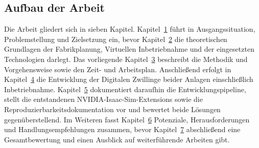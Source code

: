\subsection{Aufbau der Arbeit}
Die Arbeit gliedert sich in sieben Kapitel.
Kapitel~\hyperref[sec:einleitung]{1} führt in Ausgangssituation, Problemstellung und
Zielsetzung ein, bevor Kapitel~\hyperref[sec:grundlagen]{2} die theoretischen
Grundlagen der Fabrikplanung, Virtuellen Inbetriebnahme und der eingesetzten
Technologien darlegt.
Das vorliegende Kapitel~\hyperref[sec:methodik]{3} beschreibt die Methodik und
Vorgehensweise sowie den Zeit- und Arbeitsplan.
Anschließend erfolgt in Kapitel~\hyperref[sec:entwicklung]{4} die Entwicklung der
Digitalen Zwillinge beider Anlagen einschließlich Inbetriebnahme.
Kapitel~\hyperref[sec:ergebnisse]{5} dokumentiert daraufhin die Entwicklungspipeline,
stellt die entstandenen NVIDIA-Isaac-Sim-Extensions sowie die Reproduzierbarkeitsdokumentation
vor und bewertet beide Lösungen gegenüberstellend.
Im Weiteren fasst Kapitel~\hyperref[sec:potenziale]{6} Potenziale, Herausforderungen
und Handlungsempfehlungen zusammen, bevor Kapitel~\hyperref[sec:fazit]{7}
abschließend eine Gesamtbewertung und einen Ausblick auf weiterführende Arbeiten gibt.

